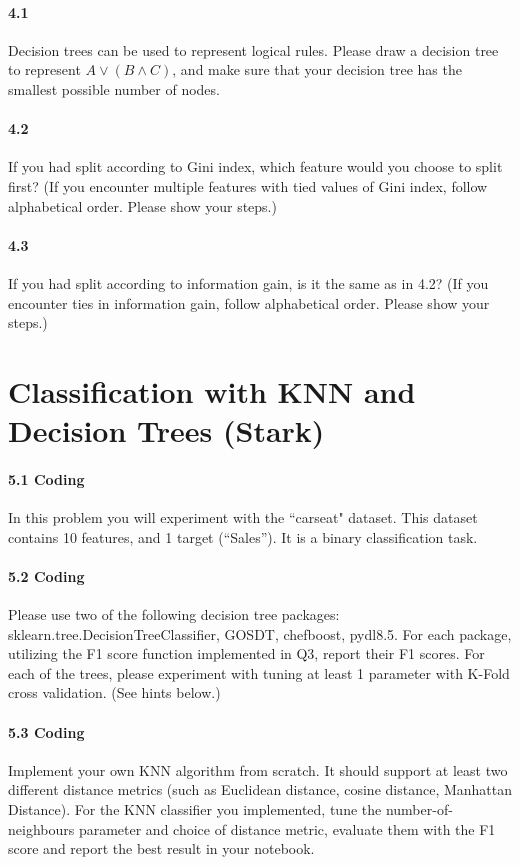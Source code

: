 \documentclass{exam}
\begin{document}
\paragraph{4.1} Decision trees can be used to represent logical rules. Please draw a decision tree to represent $A \vee (B \wedge C)$, and make sure that your decision tree has the smallest possible number of nodes.

\paragraph{4.2} If you had split according to Gini index, which feature would you choose to split first? (If you encounter multiple features with tied values of Gini index, follow alphabetical order. Please show your steps.)

\paragraph{4.3} If you had split according to information gain, is it the same as in 4.2? (If you encounter ties in information gain, follow alphabetical order. Please show your steps.)

\section{Classification with KNN and Decision Trees (Stark)}
\paragraph{5.1 Coding} In this problem you will experiment with the ``carseat" dataset. This dataset contains 10 features, and 1 target (``Sales''). It is a binary classification task. 

\paragraph{5.2 Coding} Please use two of the following decision tree packages: sklearn.tree.DecisionTreeClassifier, GOSDT, chefboost, pydl8.5. For each package, utilizing the F1 score function implemented in Q3, report their F1 scores. For each of the trees, please experiment with tuning at least 1 parameter with K-Fold cross validation. (See hints below.)

\paragraph{5.3 Coding} Implement your own KNN algorithm from scratch. It should support at least two different distance metrics (such as Euclidean distance, cosine distance, Manhattan Distance). For the KNN classifier you implemented, tune the number-of-neighbours parameter and choice of distance metric, evaluate them with the F1 score and report the best result in your notebook.
\end{document}
